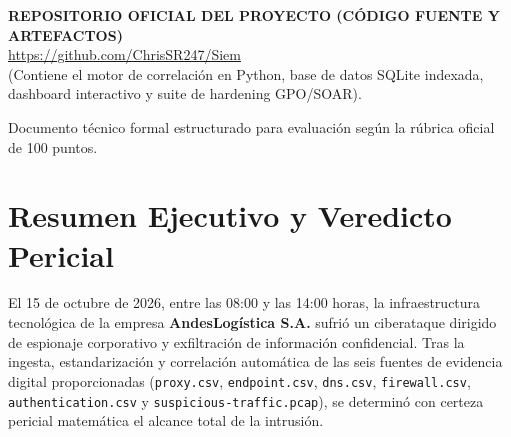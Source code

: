 \documentclass[11pt,a4paper]{article}
\begin{document}
\begin{titlepage}
    \begin{tcolorbox}[colback=red!5!white, colframe=threatred, width=0.95\textwidth, arc=2mm, boxrule=1pt]
        \centering
        \textbf{\color{threatred}REPOSITORIO OFICIAL DEL PROYECTO (CÓDIGO FUENTE Y ARTEFACTOS)}\\[0.2cm]
        \url{https://github.com/ChrisSR247/Siem}\\[0.1cm]
        \small\color{darkslate}(Contiene el motor de correlación en Python, base de datos SQLite indexada, dashboard interactivo y suite de hardening GPO/SOAR).
    \end{tcolorbox}
    
    \vfill
    {\small \color{gray} Documento técnico formal estructurado para evaluación según la rúbrica oficial de 100 puntos.}
\end{titlepage}

\newpage
\tableofcontents
\newpage

\section{Resumen Ejecutivo y Veredicto Pericial}

El 15 de octubre de 2026, entre las 08:00 y las 14:00 horas, la infraestructura tecnológica de la empresa \textbf{AndesLogística S.A.} sufrió un ciberataque dirigido de espionaje corporativo y exfiltración de información confidencial. Tras la ingesta, estandarización y correlación automática de las seis fuentes de evidencia digital proporcionadas (\texttt{proxy.csv}, \texttt{endpoint.csv}, \texttt{dns.csv}, \texttt{firewall.csv}, \texttt{authentication.csv} y \texttt{suspicious-traffic.pcap}), se determinó con certeza pericial matemática el alcance total de la intrusión.
\end{document}
